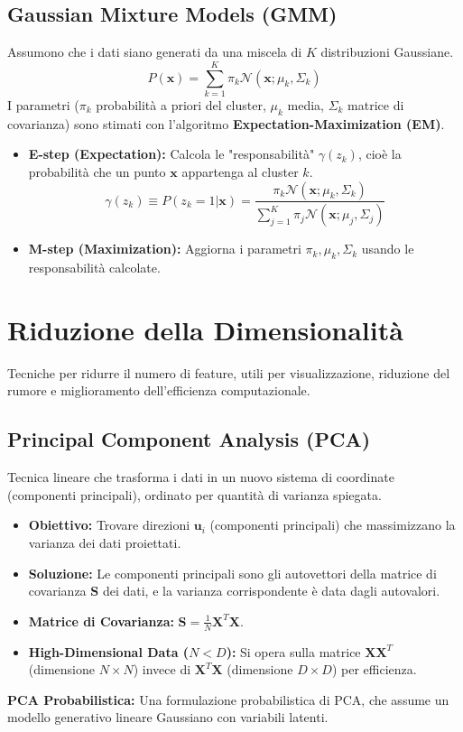 \documentclass[a4paper,11pt]{article}
\begin{document}
\subsection{Gaussian Mixture Models (GMM)}
Assumono che i dati siano generati da una miscela di $K$ distribuzioni Gaussiane.
\begin{equation}
    P(\mathbf{x}) = \sum_{k=1}^K \pi_k \mathcal{N}(\mathbf{x}; \mu_k, \Sigma_k)
\end{equation}
I parametri ($\pi_k$ probabilità a priori del cluster, $\mu_k$ media, $\Sigma_k$ matrice di covarianza) sono stimati con l'algoritmo \textbf{Expectation-Maximization (EM)}.
\begin{itemize}
    \item \textbf{E-step (Expectation):} Calcola le "responsabilità" $\gamma(z_k)$, cioè la probabilità che un punto $\mathbf{x}$ appartenga al cluster $k$.
    \begin{equation}
        \gamma(z_k) \equiv P(z_k = 1 | \mathbf{x}) = \frac{\pi_k \mathcal{N}(\mathbf{x}; \mu_k, \Sigma_k)}{\sum_{j=1}^K \pi_j \mathcal{N}(\mathbf{x}; \mu_j, \Sigma_j)}
    \end{equation}
    \item \textbf{M-step (Maximization):} Aggiorna i parametri $\pi_k, \mu_k, \Sigma_k$ usando le responsabilità calcolate.
\end{itemize}

\section{Riduzione della Dimensionalità}

Tecniche per ridurre il numero di feature, utili per visualizzazione, riduzione del rumore e miglioramento dell'efficienza computazionale.

\subsection{Principal Component Analysis (PCA)}
Tecnica lineare che trasforma i dati in un nuovo sistema di coordinate (componenti principali), ordinato per quantità di varianza spiegata.
\begin{itemize}
    \item \textbf{Obiettivo:} Trovare direzioni $\mathbf{u}_i$ (componenti principali) che massimizzano la varianza dei dati proiettati.
    \item \textbf{Soluzione:} Le componenti principali sono gli autovettori della matrice di covarianza $\mathbf{S}$ dei dati, e la varianza corrispondente è data dagli autovalori.
    \item \textbf{Matrice di Covarianza:} $\mathbf{S} = \frac{1}{N} \mathbf{X}^T \mathbf{X}$.
    \item \textbf{High-Dimensional Data ($N < D$):} Si opera sulla matrice $\mathbf{X}\mathbf{X}^T$ (dimensione $N \times N$) invece di $\mathbf{X}^T \mathbf{X}$ (dimensione $D \times D$) per efficienza.
\end{itemize}
\textbf{PCA Probabilistica:} Una formulazione probabilistica di PCA, che assume un modello generativo lineare Gaussiano con variabili latenti.
\end{document}

